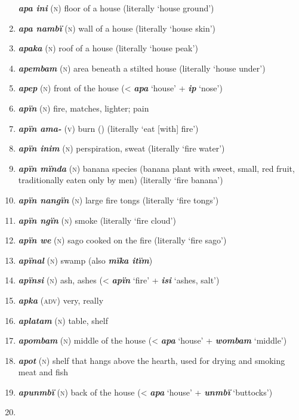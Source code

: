 \begin{enumerate}[noitemsep, label={}, align=left, widest=190, labelsep=1ex,leftmargin=*,itemindent=-10pt]
\textbf{\textit{apa ini}} (\textsc{n}) floor of a house (literally ‘house ground’) \item 
\textbf{\textit{apa nambï}} (\textsc{n}) wall of a house (literally ‘house skin’) \item 
\textbf{\textit{apaka}} (\textsc{n}) roof of a house (literally ‘house peak’) \item 
\textbf{\textit{apembam}} (\textsc{n}) area beneath a stilted house (literally ‘house under’) \item 
\textbf{\textit{apep}} (\textsc{n}) front of the house (< \textbf{\textit{apa}} ‘house’ + \textbf{\textit{ip}} ‘nose’) \item 
\textbf{\textit{apïn}} (\textsc{n}) fire, matches, lighter; pain \item 
\textbf{\textit{apïn ama-}} (\textsc{v}) burn () (literally ‘eat [with] fire’) \item 
\textbf{\textit{apïn inim}} (\textsc{n}) perspiration, sweat (literally ‘fire water’) \item 
\textbf{\textit{apïn mïnda}} (\textsc{n}) banana species (banana plant with sweet, small, red fruit, \linebreak traditionally eaten only by men) (literally ‘fire banana’) \item 
\textbf{\textit{apïn nangïn}} (\textsc{n}) large fire tongs (literally ‘fire tongs’) \item 
\textbf{\textit{apïn ngïn}} (\textsc{n}) smoke (literally ‘fire cloud’) \item 
\textbf{\textit{apïn we}} (\textsc{n}) sago cooked on the fire (literally ‘fire sago’) \item 
\textbf{\textit{apïnal}} (\textsc{n}) swamp (also \textbf{\textit{mïka itïm}}) \item 
\textbf{\textit{apïnsi}} (\textsc{n}) ash, ashes (< \textbf{\textit{apïn}} ‘fire’ + \textbf{\textit{isi}} ‘ashes, salt’) \item 
\textbf{\textit{apka}} (\textsc{adv}) very, really \item 
\textbf{\textit{aplatam}} (\textsc{n}) table, shelf \item 
\textbf{\textit{apombam}} (\textsc{n}) middle of the house (< \textbf{\textit{apa}} ‘house’ + \textbf{\textit{wombam}} ‘middle’) \item 
\textbf{\textit{apot}} (\textsc{n}) shelf that hangs above the hearth, used for drying and smoking meat and fish \item 
\textbf{\textit{apunmbï}} (\textsc{n}) back of the house (< \textbf{\textit{apa}} ‘house’ + \textbf{\textit{unmbï}} ‘buttocks’) \item 

\end{enumerate}
